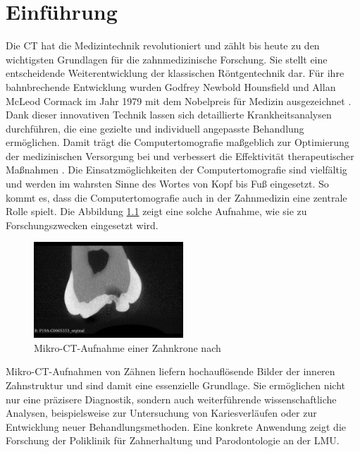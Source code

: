 \chapter{Einführung}
\label{chap:einleitung} Die \ac{CT} hat die Medizintechnik revolutioniert und
zählt bis heute zu den wichtigsten Grundlagen für die zahnmedizinische Forschung.
Sie stellt eine entscheidende Weiterentwicklung der klassischen Röntgentechnik dar.
Für ihre bahnbrechende Entwicklung wurden Godfrey Newbold Hounsfield und Allan
McLeod Cormack im Jahr 1979 mit dem Nobelpreis für Medizin ausgezeichnet \citep[vgl.][S.~12]{handels2000}.
Dank dieser innovativen Technik lassen sich detaillierte Krankheitsanalysen
durchführen, die eine gezielte und individuell angepasste Behandlung ermöglichen.
Damit trägt die Computertomografie maßgeblich zur Optimierung der medizinischen
Versorgung bei und verbessert die Effektivität therapeutischer Maßnahmen \citep[vgl.][S.~207]{de20083d}.
Die Einsatzmöglichkeiten der Computertomografie sind vielfältig und werden im
wahrsten Sinne des Wortes von Kopf bis Fuß eingesetzt. So kommt es, dass die
Computertomografie auch in der Zahnmedizin eine zentrale Rolle spielt. Die Abbildung
\ref{fig:ct_aufnahme_eines_zahns} zeigt eine solche Aufnahme, wie sie zu
Forschungszwecken eingesetzt wird.

\begin{figure}[h]
	\centering
	\includegraphics[width=0.5\textwidth]{img/micro_ct_orginal.jpg}
	\caption{Mikro-CT-Aufnahme einer Zahnkrone nach \citet{heck2024}}
	\label{fig:ct_aufnahme_eines_zahns}
\end{figure}

Mikro-\ac{CT}-Aufnahmen von Zähnen liefern hochauflösende Bilder der inneren
Zahnstruktur und sind damit eine essenzielle Grundlage. Sie ermöglichen nicht nur
eine präzisere Diagnostik, sondern auch weiterführende wissenschaftliche
Analysen, beispielsweise zur Untersuchung von Kariesverläufen oder zur Entwicklung
neuer Behandlungsmethoden. Eine konkrete Anwendung zeigt die Forschung der
Poliklinik für Zahnerhaltung und Parodontologie an der \ac{LMU}.

